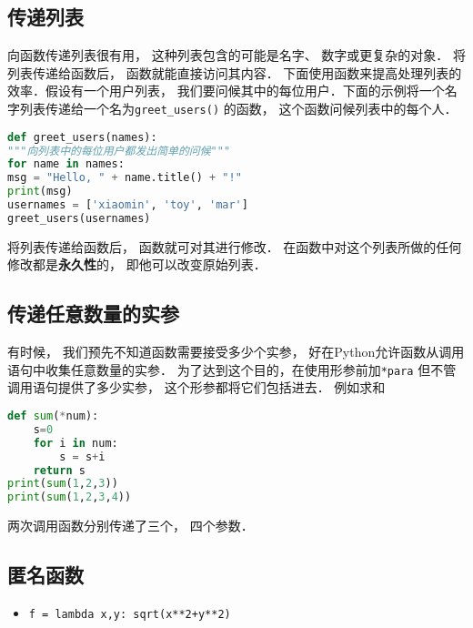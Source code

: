 \subsection{传递列表}
向函数传递列表很有用， 这种列表包含的可能是名字、 数字或更复杂的对象． 将列表传递给函数后， 函数就能直接访问其内容． 下面使用函数来提高处理列表的效率．假设有一个用户列表， 我们要问候其中的每位用户．下面的示例将一个名字列表传递给一个名为\verb|greet_users()| 的函数， 这个函数问候列表中的每个人．
\begin{lstlisting}[language=python]
def greet_users(names):
"""向列表中的每位用户都发出简单的问候"""
for name in names:
msg = "Hello, " + name.title() + "!"
print(msg)
usernames = ['xiaomin', 'toy', 'mar']
greet_users(usernames)
\end{lstlisting}
将列表传递给函数后， 函数就可对其进行修改． 在函数中对这个列表所做的任何修改都是\textbf{永久性}的， 即他可以改变原始列表．

\subsection{传递任意数量的实参}
有时候， 我们预先不知道函数需要接受多少个实参， 好在Python允许函数从调用语句中收集任意数量的实参． 为了达到这个目的，在使用形参前加\verb|*para| 但不管调用语句提供了多少实参， 这个形参都将它们包括进去． 例如求和
\begin{lstlisting}[language=python]
def sum(*num):
    s=0
    for i in num:
        s = s+i
    return s
print(sum(1,2,3))
print(sum(1,2,3,4))
\end{lstlisting}
两次调用函数分别传递了三个， 四个参数．

\subsection{匿名函数}
\begin{itemize}
\item \verb|f = lambda x,y: sqrt(x**2+y**2)|
\end{itemize}
